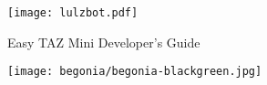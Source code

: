 %
%
%
%
%

\date {}
\thispagestyle{empty}
\begin{center}
\par
\texttt{[image: lulzbot.pdf]}

{\fontsize{25pt}{5cm}\selectfont \textcolor{ao-purple}{Easy TAZ Mini Developer's Guide}}

\texttt{[image: begonia/begonia-blackgreen.jpg]}

\end{center}
